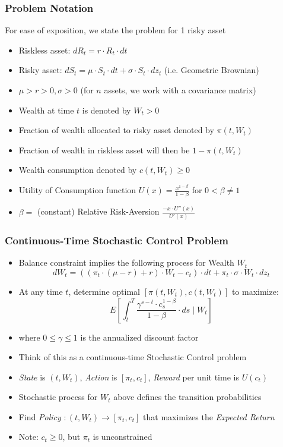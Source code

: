 \documentclass[handout]{beamer}
\begin{document}
\begin{frame}
\frametitle{Problem Notation}
\pause
For ease of exposition, we state the problem for 1 risky asset
\pause
\begin{itemize}[<+->]
\item Riskless asset: $dR_t = r \cdot R_t \cdot dt$
\item Risky asset: $dS_t = \mu \cdot S_t \cdot dt + \sigma \cdot S_t \cdot dz_t$ (i.e. Geometric Brownian)
\item $\mu > r > 0, \sigma > 0$ (for $n$ assets, we work with a covariance matrix)
\item Wealth at time $t$ is denoted by $W_t > 0$
\item Fraction of wealth allocated to risky asset denoted by $\pi(t, W_t)$
\item Fraction of wealth in riskless asset will then be $1 - \pi(t, W_t)$
\item Wealth consumption denoted by $c(t, W_t) \geq 0$
\item Utility of Consumption function $U(x) = \frac {x^{1-\beta}} {1 - \beta}$ for $0 < \beta \neq 1$
\item $\beta =$ (constant) Relative Risk-Aversion $\frac {-x \cdot U''(x)} {U'(x)}$
\end{itemize}
\end{frame}

\begin{frame}
\frametitle{Continuous-Time Stochastic Control Problem}
\pause
\begin{itemize}[<+->]
\item Balance constraint implies the following process for Wealth $W_t$
$$dW_t = ((\pi_t \cdot (\mu - r) + r) \cdot W_t - c_t) \cdot dt + \pi_t \cdot \sigma \cdot W_t \cdot dz_t$$
\item At any time $t$, determine optimal $[\pi(t,W_t), c(t, W_t)]$ to maximize:
$$E[\int_t^T \frac {\gamma^{s-t} \cdot c_s^{1-\beta}} {1-\beta} \cdot ds \mid W_t]$$
\item where $0 \leq \gamma \leq 1$ is the annualized discount factor
\item Think of this as a continuous-time Stochastic Control problem
\item {\em State} is $(t, W_t)$, {\em Action} is $[\pi_t, c_t]$, {\em Reward} per unit time is $U(c_t)$
\item Stochastic process for $W_t$ above defines the transition probabilities
\item Find {\em Policy} $: (t, W_t) \rightarrow [\pi_t, c_t]$ that maximizes the {\em Expected Return}
\item Note: $c_t \geq 0$, but $\pi_t$ is unconstrained
\end{itemize}
\end{frame}
\end{document}
